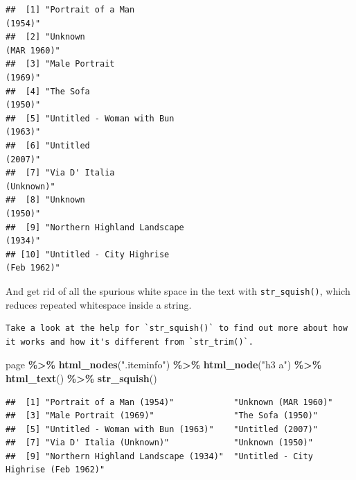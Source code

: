 \documentclass[
]{article}
\newenvironment{Shaded}{\begin{snugshade}}{\end{snugshade}}
\newcommand{\FunctionTok}[1]{\textcolor[rgb]{0.13,0.29,0.53}{\textbf{#1}}}
\newcommand{\NormalTok}[1]{#1}
\newcommand{\SpecialCharTok}[1]{\textcolor[rgb]{0.81,0.36,0.00}{\textbf{#1}}}
\newcommand{\StringTok}[1]{\textcolor[rgb]{0.31,0.60,0.02}{#1}}
\begin{document}
\begin{verbatim}
##  [1] "Portrait of a Man                                                                            (1954)"           
##  [2] "Unknown                                                                            (MAR 1960)"                 
##  [3] "Male Portrait                                                                            (1969)"               
##  [4] "The Sofa                                                                            (1950)"                    
##  [5] "Untitled - Woman with Bun                                                                            (1963)"   
##  [6] "Untitled                                                                            (2007)"                    
##  [7] "Via D' Italia                                                                            (Unknown)"            
##  [8] "Unknown                                                                            (1950)"                     
##  [9] "Northern Highland Landscape                                                                            (1934)" 
## [10] "Untitled - City Highrise                                                                            (Feb 1962)"
\end{verbatim}

And get rid of all the spurious white space in the text with
\texttt{str\_squish()}, which reduces repeated whitespace inside a
string.

\begin{verbatim}
Take a look at the help for `str_squish()` to find out more about how it works and how it's different from `str_trim()`.
\end{verbatim}

\begin{Shaded}
\begin{Highlighting}[]
\NormalTok{page }\SpecialCharTok{\%\textgreater{}\%}
  \FunctionTok{html\_nodes}\NormalTok{(}\StringTok{".iteminfo"}\NormalTok{) }\SpecialCharTok{\%\textgreater{}\%}
  \FunctionTok{html\_node}\NormalTok{(}\StringTok{"h3 a"}\NormalTok{) }\SpecialCharTok{\%\textgreater{}\%}
  \FunctionTok{html\_text}\NormalTok{() }\SpecialCharTok{\%\textgreater{}\%}
  \FunctionTok{str\_squish}\NormalTok{()}
\end{Highlighting}
\end{Shaded}

\begin{verbatim}
##  [1] "Portrait of a Man (1954)"            "Unknown (MAR 1960)"                 
##  [3] "Male Portrait (1969)"                "The Sofa (1950)"                    
##  [5] "Untitled - Woman with Bun (1963)"    "Untitled (2007)"                    
##  [7] "Via D' Italia (Unknown)"             "Unknown (1950)"                     
##  [9] "Northern Highland Landscape (1934)"  "Untitled - City Highrise (Feb 1962)"
\end{verbatim}
\end{document}
